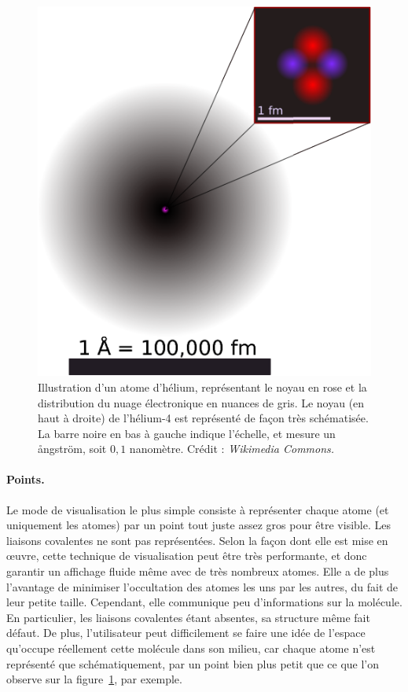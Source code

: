 	\begin{figure}[htb]
		\centering
		\includegraphics[width=\textwidth]{figures/ch1/helium}
		\caption{Illustration d'un atome d'hélium, représentant le noyau en rose et la distribution du nuage électronique en nuances de gris. Le noyau (en haut à droite) de l'hélium-4 est représenté de façon très schématisée. La barre noire en bas à gauche indique l'échelle, et mesure un \aa{}ngström, soit $0,1$ nanomètre. Crédit : \emph{Wikimedia Commons.}}
		\label{fig:helium}
	\end{figure}
	
	\paragraph{Points.} Le mode de visualisation le plus simple consiste à représenter chaque atome (et uniquement les atomes) par un point tout juste assez gros pour être visible. Les liaisons covalentes ne sont pas représentées. Selon la façon dont elle est mise en œuvre, cette technique de visualisation peut être très performante, et donc garantir un affichage fluide même avec de très nombreux atomes. Elle a de plus l'avantage de minimiser l'occultation des atomes les uns par les autres, du fait de leur petite taille. Cependant, elle communique peu d'informations sur la molécule. En particulier, les liaisons covalentes étant absentes, sa structure même fait défaut. De plus, l'utilisateur peut difficilement se faire une idée de l'espace qu'occupe réellement cette molécule dans son milieu, car chaque atome n'est représenté que schématiquement, par un point bien plus petit que ce que l'on observe sur la figure~\ref{fig:helium}, par exemple.
		
